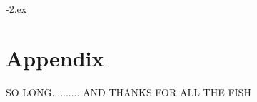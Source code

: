 \documentclass[
ngerman,
paper=a4,
asymmetric,
fontsize=10pt,
draft=false,
numbers=noenddot,
bibtotocnumbered,
footnotes=multiple,
toc=flat,
]{scrbook}
\begin{document}
\dominitoc[n]

\begin{WidePar}
  {\setcounter{tocdepth}{2}\footnotesize\tableofcontents}

% 


{\small\kern-2.ex}
\end{WidePar}







\appendix
\part*{Appendix}

\printnotes


{\small\printindex}




SO LONG.......... AND THANKS FOR ALL THE FISH
\end{document}
